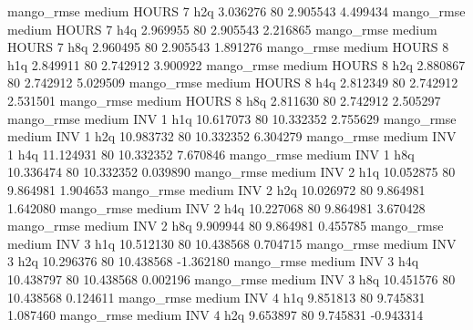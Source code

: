        mango_rmse     medium    HOURS                 7                  h2q  3.036276 80       2.905543           4.499434
       mango_rmse     medium    HOURS                 7                  h4q  2.969955 80       2.905543           2.216865
       mango_rmse     medium    HOURS                 7                  h8q  2.960495 80       2.905543           1.891276
       mango_rmse     medium    HOURS                 8                  h1q  2.849911 80       2.742912           3.900922
       mango_rmse     medium    HOURS                 8                  h2q  2.880867 80       2.742912           5.029509
       mango_rmse     medium    HOURS                 8                  h4q  2.812349 80       2.742912           2.531501
       mango_rmse     medium    HOURS                 8                  h8q  2.811630 80       2.742912           2.505297
       mango_rmse     medium      INV                 1                  h1q 10.617073 80      10.332352           2.755629
       mango_rmse     medium      INV                 1                  h2q 10.983732 80      10.332352           6.304279
       mango_rmse     medium      INV                 1                  h4q 11.124931 80      10.332352           7.670846
       mango_rmse     medium      INV                 1                  h8q 10.336474 80      10.332352           0.039890
       mango_rmse     medium      INV                 2                  h1q 10.052875 80       9.864981           1.904653
       mango_rmse     medium      INV                 2                  h2q 10.026972 80       9.864981           1.642080
       mango_rmse     medium      INV                 2                  h4q 10.227068 80       9.864981           3.670428
       mango_rmse     medium      INV                 2                  h8q  9.909944 80       9.864981           0.455785
       mango_rmse     medium      INV                 3                  h1q 10.512130 80      10.438568           0.704715
       mango_rmse     medium      INV                 3                  h2q 10.296376 80      10.438568          -1.362180
       mango_rmse     medium      INV                 3                  h4q 10.438797 80      10.438568           0.002196
       mango_rmse     medium      INV                 3                  h8q 10.451576 80      10.438568           0.124611
       mango_rmse     medium      INV                 4                  h1q  9.851813 80       9.745831           1.087460
       mango_rmse     medium      INV                 4                  h2q  9.653897 80       9.745831          -0.943314
